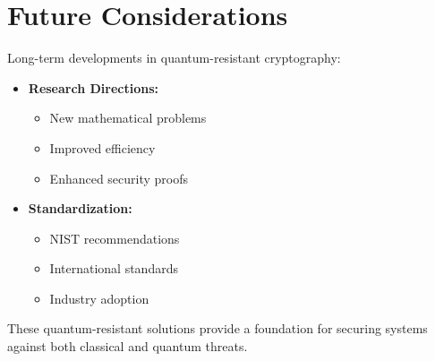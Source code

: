 \section{Future Considerations}\label{sec:pqc_future}

Long-term developments in quantum-resistant cryptography:

\begin{itemize}
    \item \textbf{Research Directions:}
    \begin{itemize}
        \item New mathematical problems
        \item Improved efficiency
        \item Enhanced security proofs
    \end{itemize}
    \item \textbf{Standardization:}
    \begin{itemize}
        \item NIST recommendations
        \item International standards
        \item Industry adoption
    \end{itemize}
\end{itemize}

These quantum-resistant solutions provide a foundation for securing systems against both classical and quantum threats.